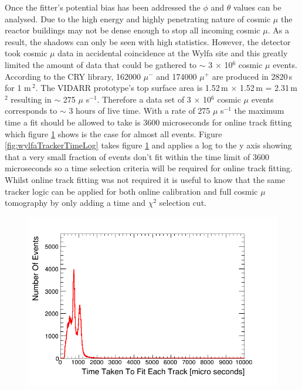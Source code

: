 Once the fitter's potential bias has been addressed the $\phi$ and $\theta$ values can be analysed. Due to the high energy and highly penetrating nature of cosmic $\mu$ \cite{Olive_2014} the reactor buildings may not be dense enough to stop all incoming cosmic $\mu$. As a result, the shadows can only be seen with high statistics. However, the detector took cosmic $\mu$ data in accidental coincidence at the Wylfa site and this greatly limited the amount of data that could be gathered to $\sim$ 3 $\times$ 10$^6$ cosmic $\mu$ events. According to the CRY library, \cite{ieee_cry_2007} 162000 $\mu^-$ and 174000 $\mu^+$ are produced in 2820\,s for 1 m\,$^2$. The VIDARR prototype's top surface area is 1.52\,m $\times$ 1.52\,m = 2.31\,m$^2$ resulting in $\sim$ 275 $\mu$ s$^{-1}$. Therefore a data set of 3 $\times$ 10$^6$ cosmic $\mu$ events corresponds to $\sim$ 3 hours of live time. With a rate of 275 $\mu$ s$^{-1}$ the maximum time a fit should be allowed to take is 3600 microseconds for online track fitting which figure \ref{fig:wylfaTrackerTime} shows is the case for almost all events. Figure \ref{fig:wylfaTrackerTimeLog} takes figure \ref{fig:wylfaTrackerTime} and applies a log to the y axis showing that a very small fraction of events don't fit within the time limit of 3600 microseconds so a time selection criteria will be required for online track fitting. Whilst online track fitting was not required it is useful to know that the same tracker logic can be applied for both online calibration and full cosmic $\mu$ tomography by only adding a time and $\chi^2$ selection cut. 

 \begin{figure}[htbp]
 \centering
 \includegraphics[width=0.7\linewidth]{Chapter5/Figs/Raster/wylfaTrackerTime.png}
 \label{fig:wylfaTrackerTime}
\end{figure}

